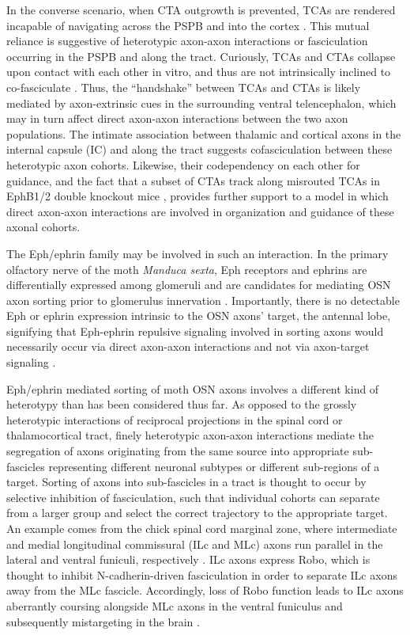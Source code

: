 In the converse scenario, when CTA outgrowth is prevented, TCAs are rendered incapable of navigating across the PSPB and into the cortex \cite{chen2012evidence}.
This mutual reliance is suggestive of heterotypic axon-axon interactions or fasciculation occurring in the PSPB and along the tract.
Curiously, TCAs and CTAs collapse upon contact with each other in vitro, and thus are not intrinsically inclined to co-fasciculate \cite{bagnard2001axonal}.
Thus, the ``handshake'' between TCAs and CTAs is likely mediated by axon-extrinsic cues in the surrounding ventral telencephalon, which may in turn affect direct axon-axon interactions between the two axon populations.
The intimate association between thalamic and cortical axons in the internal capsule (IC) and along the tract \cite{molnar1998mechanisms} suggests cofasciculation between these heterotypic axon cohorts.
Likewise, their codependency on each other for guidance, and the fact that a subset of CTAs track along misrouted TCAs in EphB1/2 double knockout mice \cite{robichaux2014ephb}, provides further support to a model in which direct axon-axon interactions are involved in organization and guidance of these axonal cohorts.

The Eph/ephrin family may be involved in such an interaction.
In the primary olfactory nerve of the moth \emph{Manduca sexta}, Eph receptors and ephrins are differentially expressed among glomeruli and are candidates for mediating OSN axon sorting prior to glomerulus innervation \cite{kaneko2003interaxonal}.
Importantly, there is no detectable Eph or ephrin expression intrinsic to the OSN axons' target, the antennal lobe, signifying that Eph-ephrin repulsive signaling involved in sorting axons would necessarily occur via direct axon-axon interactions and not via axon-target signaling \cite{kaneko2003interaxonal}.

Eph/ephrin mediated sorting of moth OSN axons involves a different kind of heterotypy than has been considered thus far.
As opposed to the grossly heterotypic interactions of reciprocal projections in the spinal cord or thalamocortical tract, finely heterotypic axon-axon interactions mediate the segregation of axons originating from the same source into appropriate sub-fascicles representing different neuronal subtypes or different sub-regions of a target.
Sorting of axons into sub-fascicles in a tract is thought to occur by selective inhibition of fasciculation, such that individual cohorts can separate from a larger group and select the correct trajectory to the appropriate target.
An example comes from the chick spinal cord marginal zone, where intermediate and medial longitudinal commissural (ILc and MLc) axons run parallel in the lateral and ventral funiculi, respectively \cite{sakai2012axon}.
ILc axons express Robo, which is thought to inhibit N-cadherin-driven fasciculation in order to separate ILc axons away from the MLc fascicle.
Accordingly, loss of Robo function leads to ILc axons aberrantly coursing alongside MLc axons in the ventral funiculus and subsequently mistargeting in the brain \cite{sakai2012axon}.

